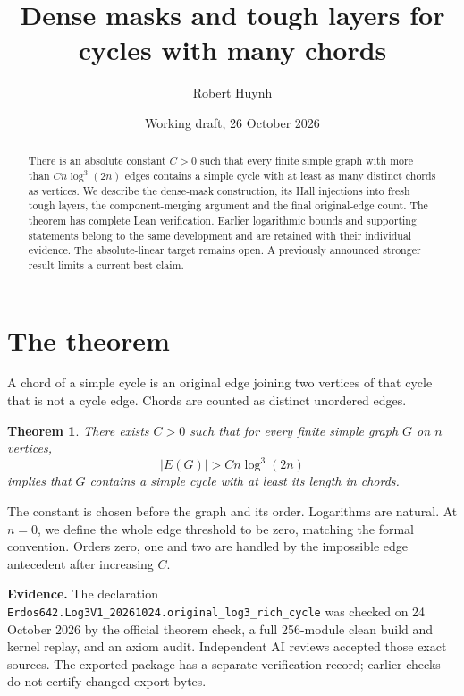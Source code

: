 \documentclass[11pt]{article}
\title{Dense masks and tough layers for cycles with many chords}
\author{Robert Huynh}
\date{Working draft, 26 October 2026}
\newtheorem{theorem}{Theorem}
\newcommand{\status}[1]{\par\noindent\textcolor{blue!45!black}{\textbf{Evidence.} #1}\par}
\begin{document}
\maketitle
\begin{abstract}
There is an absolute constant $C>0$ such that every finite simple graph with more than $Cn\log^3(2n)$ edges contains a simple cycle with at least as many distinct chords as vertices. We describe the dense-mask construction, its Hall injections into fresh tough layers, the component-merging argument and the final original-edge count. The theorem has complete Lean verification. Earlier logarithmic bounds and supporting statements belong to the same development and are retained with their individual evidence. The absolute-linear target remains open. A previously announced stronger result limits a current-best claim.
\end{abstract}
\tableofcontents

\section{The theorem}
A chord of a simple cycle is an original edge joining two vertices of that cycle that is not a cycle edge. Chords are counted as distinct unordered edges.
\begin{theorem}
There exists $C>0$ such that for every finite simple graph $G$ on $n$ vertices,
\[
 |E(G)|>Cn\log^3(2n)
\]
implies that $G$ contains a simple cycle with at least its length in chords.
\end{theorem}
The constant is chosen before the graph and its order. Logarithms are natural. At $n=0$, we define the whole edge threshold to be zero, matching the formal convention. Orders zero, one and two are handled by the impossible edge antecedent after increasing $C$.
\status{The declaration \nolinkurl{Erdos642.Log3V1_20261024.original_log3_rich_cycle} was checked on 24 October 2026 by the official theorem check, a full 256-module clean build and kernel replay, and an axiom audit. Independent AI reviews accepted those exact sources. The exported package has a separate verification record; earlier checks do not certify changed export bytes.}
\end{document}
